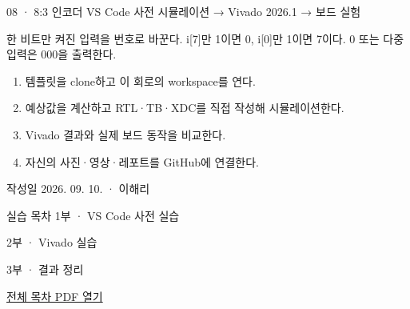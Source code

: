 
\renewcommand{\labonehome}{\hyperlink{modern-08-contents}{\contentsbutton}}
\renewcommand{\legacySource}[1]{}
\providecommand{\terminalbox}[1]{\par\vspace{0.15cm}{\setlength{\fboxsep}{7pt}\colorbox{black}{\parbox{\dimexpr\textwidth-14pt\relax}{\color{white}\ttfamily\fontsize{7}{9}\selectfont #1}}}\par\vspace{0.15cm}}

\begingroup
\renewcommand{\small}{\fontsize{9}{11}\selectfont}
\begin{frame}{08 · 8:3 인코더}\relax
\small
VS Code 사전 시뮬레이션 → Vivado 2026.1 → 보드 실험\par\vspace{0.22cm}한 비트만 켜진 입력을 번호로 바꾼다. i[7]만 1이면 0, i[0]만 1이면 7이다. 0 또는 다중 입력은 000을 출력한다.\par\begin{enumerate}\setlength{\itemsep}{0.22cm}
\item 템플릿을 clone하고 이 회로의 workspace를 연다.
\item 예상값을 계산하고 RTL·TB·XDC를 직접 작성해 시뮬레이션한다.
\item Vivado 결과와 실제 보드 동작을 비교한다.
\item 자신의 사진·영상·레포트를 GitHub에 연결한다.
\end{enumerate}
작성일 2026. 09. 10. · 이해리\par
\end{frame}

\begin{frame}[label=modern-08-contents]{실습 목차}\relax
\small
1부 · VS Code 사전 실습\par{}\par\vspace{0.2cm}
\par\vspace{0.4cm}
2부 · Vivado 실습\par{}\par\vspace{0.4cm}
3부 · 결과 정리\par{}\par\vspace{0.35cm}
\href{04.LAB1_00_CONTENTS.pdf}{전체 목차 PDF 열기}
\end{frame}

